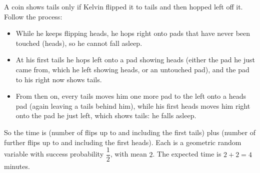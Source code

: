 A coin shows tails only if Kelvin flipped it to tails and then hopped left off it. Follow the process:
\begin{itemize}
\item While he keeps flipping heads, he hops right onto pads that have never been touched (heads), so he cannot fall asleep.
\item At his first tails he hops left onto a pad showing heads (either the pad he just came from, which he left showing heads, or an untouched pad), and the pad to his right now shows tails.
\item From then on, every tails moves him one more pad to the left onto a heads pad (again leaving a tails behind him), while his first heads moves him right onto the pad he just left, which shows tails: he falls asleep.
\end{itemize}
So the time is (number of flips up to and including the first tails) plus (number of further flips up to and including the first heads). Each is a geometric random variable with success probability $\dfrac{1}{2}$, with mean $2$. The expected time is $2+2=\boxed{4}$ minutes.
